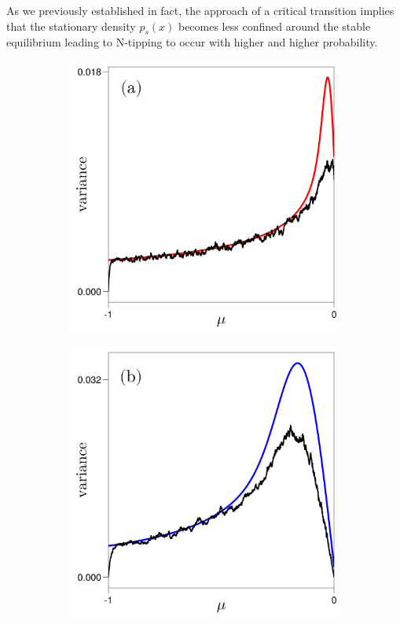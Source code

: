 \documentclass[../main.tex]{subfiles}
\begin{document}
As we previously established in fact, the approach of a critical transition implies that the stationary density $p_{s}(x)$ becomes less confined around the stable equilibrium leading to N-tipping to occur with higher and higher probability.
\begin{figure}[H]
    \centering 
    \begin{subfigure}[b]{0.3\textwidth}
        \centering 
        \includegraphics[keepaspectratio, width = \textwidth]{../figures/fig3.5.1.png}
        \label{fig3.5.1}
    \end{subfigure}
    \hfill 
    \begin{subfigure}[b]{0.3\textwidth}
        \centering 
        \includegraphics[keepaspectratio, width = \textwidth]{../figures/fig3.5.2.png}

\end{subfigure}
\end{figure}
\end{document}
